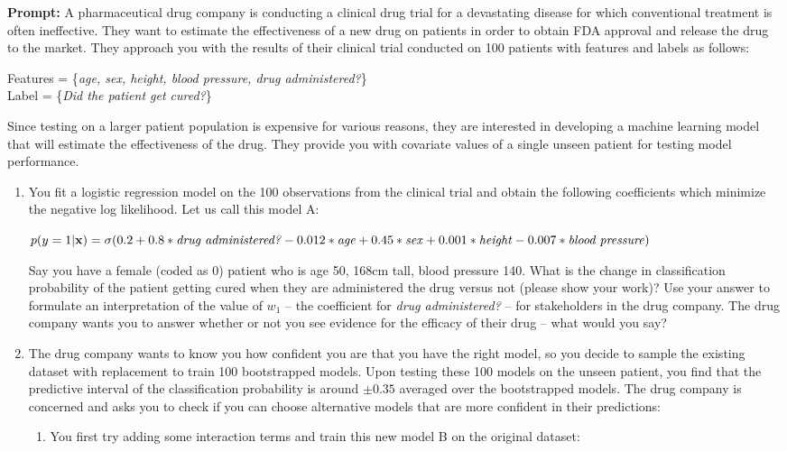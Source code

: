 \documentclass[submit]{harvardml}
\begin{document}

\begin{problem}

\textbf{Prompt:} A pharmaceutical drug company is conducting a clinical drug trial for a devastating disease for which conventional treatment is often ineffective. They want to estimate the effectiveness of a new drug on patients in order to obtain FDA approval and release the drug to the market. They approach you with the results of their clinical trial conducted on 100 patients with features and labels as follows:

Features = \{\textit{age, sex, height, blood pressure, drug administered?}\} \\
Label = \{\textit{Did the patient get cured?}\}

Since testing on a larger patient population is expensive for various reasons, they are interested in developing a machine learning model that will estimate the effectiveness of the drug. They provide you with covariate values of a single unseen patient for testing model performance. 

\begin{enumerate}
    \item You fit a logistic regression model on the 100 observations from the clinical trial and obtain the following coefficients which minimize the negative log likelihood. Let us call this model A:

    $p(y=1 | \mathbf{x}) = \sigma(0.2 + 0.8 *\text{\textit{drug administered?}} - 0.012 *\text{\textit{age}} + 0.45*\text{\textit{sex}} +  0.001*\text{\textit{height}} - 0.007*\text{\textit{blood pressure}})$

    Say you have a female (coded as 0) patient who is age 50, 168cm tall, blood pressure 140. What is the change in classification probability of the patient getting cured when they are administered the drug versus not (please show your work)?  Use your answer to formulate an interpretation of the value of $w_1$ -- the coefficient for \textit{drug administered?} -- for stakeholders in the drug company. The drug company wants you to answer whether or not you see evidence for the efficacy of their drug -- what would you say?

    \item The drug company wants to know you how confident you are that you have the right model, so you decide to sample the existing dataset with replacement to train 100 bootstrapped models. Upon testing these 100 models on the unseen patient, you find that the predictive interval of the classification probability is around $\pm 0.35$ averaged over the bootstrapped models. The drug company is concerned and asks you to check if you can choose alternative models that are more confident in their predictions:
    \begin{enumerate}
        \item You first try adding some interaction terms and train this new model B on the original dataset:


\end{enumerate}
\end{enumerate}
\end{problem}
\end{document}
